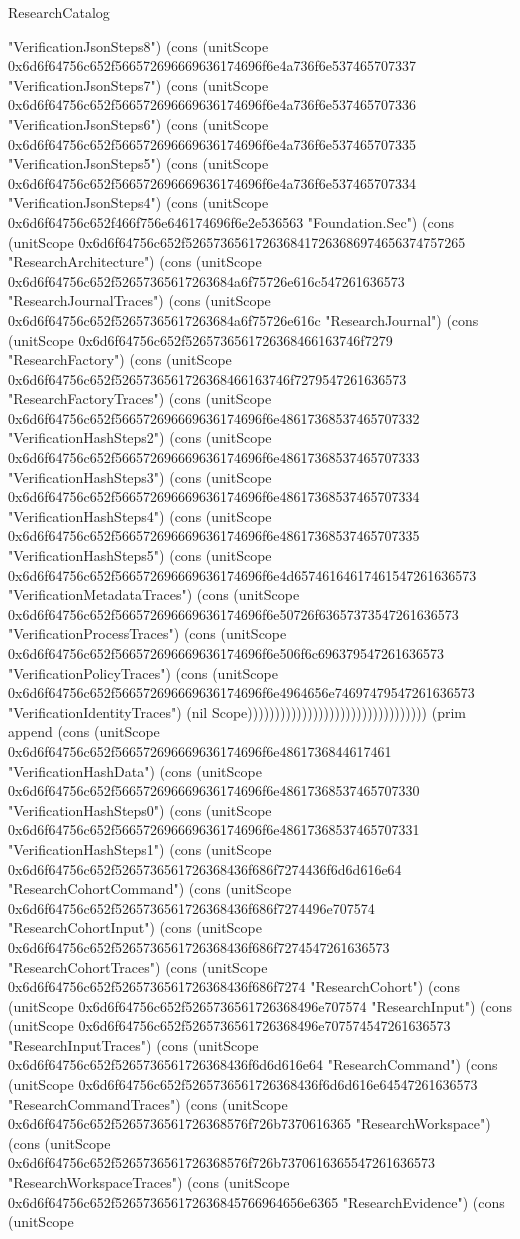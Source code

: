 \begin{lexlean}{ResearchCatalog}
\begin{semanticmodule}
{"VerificationJsonSteps8") (cons (unitScope 0x6d6f64756c652f566572696669636174696f6e4a736f6e537465707337 "VerificationJsonSteps7") (cons (unitScope 0x6d6f64756c652f566572696669636174696f6e4a736f6e537465707336 "VerificationJsonSteps6") (cons (unitScope 0x6d6f64756c652f566572696669636174696f6e4a736f6e537465707335 "VerificationJsonSteps5") (cons (unitScope 0x6d6f64756c652f566572696669636174696f6e4a736f6e537465707334 "VerificationJsonSteps4") (cons (unitScope 0x6d6f64756c652f466f756e646174696f6e2e536563 "Foundation.Sec") (cons (unitScope 0x6d6f64756c652f5265736561726368417263686974656374757265 "ResearchArchitecture") (cons (unitScope 0x6d6f64756c652f52657365617263684a6f75726e616c547261636573 "ResearchJournalTraces") (cons (unitScope 0x6d6f64756c652f52657365617263684a6f75726e616c "ResearchJournal") (cons (unitScope 0x6d6f64756c652f5265736561726368466163746f7279 "ResearchFactory") (cons (unitScope 0x6d6f64756c652f5265736561726368466163746f7279547261636573 "ResearchFactoryTraces") (cons (unitScope 0x6d6f64756c652f566572696669636174696f6e48617368537465707332 "VerificationHashSteps2") (cons (unitScope 0x6d6f64756c652f566572696669636174696f6e48617368537465707333 "VerificationHashSteps3") (cons (unitScope 0x6d6f64756c652f566572696669636174696f6e48617368537465707334 "VerificationHashSteps4") (cons (unitScope 0x6d6f64756c652f566572696669636174696f6e48617368537465707335 "VerificationHashSteps5") (cons (unitScope 0x6d6f64756c652f566572696669636174696f6e4d65746164617461547261636573 "VerificationMetadataTraces") (cons (unitScope 0x6d6f64756c652f566572696669636174696f6e50726f63657373547261636573 "VerificationProcessTraces") (cons (unitScope 0x6d6f64756c652f566572696669636174696f6e506f6c696379547261636573 "VerificationPolicyTraces") (cons (unitScope 0x6d6f64756c652f566572696669636174696f6e4964656e74697479547261636573 "VerificationIdentityTraces") (nil Scope))))))))))))))))))))))))))))))))) (prim append (cons (unitScope 0x6d6f64756c652f566572696669636174696f6e4861736844617461 "VerificationHashData") (cons (unitScope 0x6d6f64756c652f566572696669636174696f6e48617368537465707330 "VerificationHashSteps0") (cons (unitScope 0x6d6f64756c652f566572696669636174696f6e48617368537465707331 "VerificationHashSteps1") (cons (unitScope 0x6d6f64756c652f5265736561726368436f686f7274436f6d6d616e64 "ResearchCohortCommand") (cons (unitScope 0x6d6f64756c652f5265736561726368436f686f7274496e707574 "ResearchCohortInput") (cons (unitScope 0x6d6f64756c652f5265736561726368436f686f7274547261636573 "ResearchCohortTraces") (cons (unitScope 0x6d6f64756c652f5265736561726368436f686f7274 "ResearchCohort") (cons (unitScope 0x6d6f64756c652f5265736561726368496e707574 "ResearchInput") (cons (unitScope 0x6d6f64756c652f5265736561726368496e707574547261636573 "ResearchInputTraces") (cons (unitScope 0x6d6f64756c652f5265736561726368436f6d6d616e64 "ResearchCommand") (cons (unitScope 0x6d6f64756c652f5265736561726368436f6d6d616e64547261636573 "ResearchCommandTraces") (cons (unitScope 0x6d6f64756c652f5265736561726368576f726b7370616365 "ResearchWorkspace") (cons (unitScope 0x6d6f64756c652f5265736561726368576f726b7370616365547261636573 "ResearchWorkspaceTraces") (cons (unitScope 0x6d6f64756c652f526573656172636845766964656e6365 "ResearchEvidence") (cons (unitScope }
\end{semanticmodule}
\end{lexlean}
